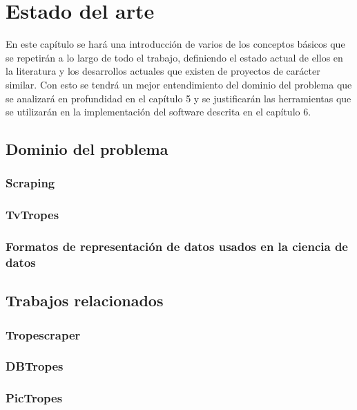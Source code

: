 \chapter{Estado del arte}

En este capítulo se hará una introducción de varios de los conceptos básicos que se repetirán a lo largo de todo el trabajo, definiendo el estado actual de ellos en la literatura y los desarrollos actuales que existen de proyectos de carácter similar. Con esto se tendrá un mejor entendimiento del dominio del problema que se analizará en profundidad en el capítulo 5 y se justificarán las herramientas que se utilizarán en la implementación del software descrita en el capítulo 6.

\section{Dominio del problema}
\subsection{Scraping}
\subsection{TvTropes}
\subsection{Formatos de representación de datos usados en la ciencia de datos}
\section{Trabajos relacionados}
\subsection{Tropescraper}
\subsection{DBTropes}
\subsection{PicTropes}